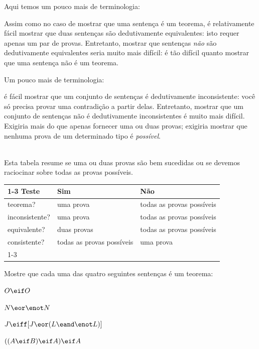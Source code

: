 Aqui temos um pouco mais de terminologia:

Assim como no caso de mostrar que uma sentença é um teorema, é relativamente fácil mostrar que duas sentenças são dedutivamente equivalentes: isto requer apenas um par de provas. Entretanto, mostrar que sentenças \emph{não} são dedutivamente equivalentes seria muito mais difícil: é tão difícil quanto mostrar que uma sentença não é um teorema.

Um pouco mais de terminologia:
        
        é fácil mostrar que um conjunto de sentenças é dedutivamente inconsistente: você só precisa provar uma contradição a partir delas.  Entretanto,  mostrar que um conjunto de sentenças não é dedutivamente inconsistentes é muito mais difícil. Exigiria mais do que apenas fornecer uma ou duas provas; exigiria mostrar que nenhuma prova de um determinado tipo é \emph{possível}.

\
\\
Esta tabela resume se uma ou duas provas são bem sucedidas ou se devemos raciocinar sobre todas as provas possíveis.
{ %
\begin{center}
\begin{tabular}{l l l}
\cline{1-3}
 \textbf{Teste}& \textbf{Sim} & \textbf{ Não}\\
 \hline
teorema? & uma prova & todas as provas possíveis\\
inconsistente? &  uma prova  & todas as provas possíveis\\
equivalente? & duas provas & todas as provas possíveis\\
consistente? & todas as provas possíveis & uma prova\\
\cline{1-3}
\end{tabular}
\end{center}}

\practiceproblems
\problempart
Mostre que cada uma das quatro seguintes sentenças é um teorema:
\begin{earg}
\item $O \eif O$
\item $N \eor \enot N$
\item $J \eiff [J\eor (L\eand\enot L)]$
\item $((A \eif B) \eif A) \eif A$ 
\end{earg}

